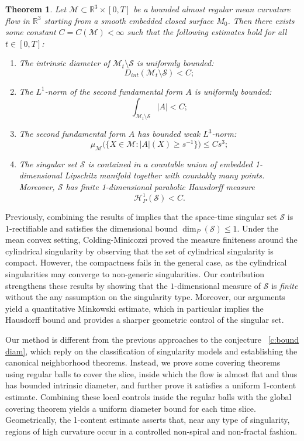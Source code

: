 \documentclass[11pt,reqno]{amsart}
\numberwithin{equation}{section}
\newcommand{\RR}{\mathds{R}}
\newcommand{\cH}{\mathcal{H}}
\newcommand{\cM}{\mathcal{M}}
\newcommand{\cS}{\mathcal{S}}
\newtheorem{theorem}[equation]{Theorem}
\theoremstyle{definition}
\theoremstyle{remark}
\theoremstyle{remark}
\theoremstyle{remark}
\theoremstyle{remark}\newtheorem{conjecture}[equation]{Conjecture}
\theoremstyle{remark}\newtheorem{question}[equation]{Question}
\begin{document}
\begin{theorem}\label{t:main almost regular}
    Let $\cM \subset \RR^3 \times [0,T]$ be a bounded almost regular mean curvature flow in $\RR^3$ starting from a smooth embedded closed surface $M_0$. Then there exists some constant $C=C(\cM)< \infty$ such that the following estimates hold for all $t\in [0,T]$:
    \begin{enumerate}
        \item The intrinsic diameter of $\cM_t \setminus\cS$ is uniformly bounded:  $$D_{int}(\cM_t\setminus\cS) < C;$$
        \item The $L^1$-norm of the second fundamental form $A$ is uniformly bounded: $$\int_{\cM_t\setminus \cS} |A| < C;$$
        \item The second fundamental form $A$ has bounded weak $L^3$-norm:
        $$\mu_{\cM}\big( \{ X \in \cM : |A|(X) \ge s^{-1} \} \big) \le C s^3;$$
        \item The singular set $\cS$ is contained in a countable union of embedded 1-dimensional Lipschitz manifold together with countably many points. Moreover, $\cS$ has finite 1-dimensional parabolic Hausdorff measure $$\cH_P^1(\cS) < C.$$
    \end{enumerate}
\end{theorem}



Previously, combining the results of \cite{CHN13,CM16,BK23} implies that the space-time singular set $\cS$ is 1-rectifiable and satisfies the dimensional bound $\dim_P(\cS) \le 1$. Under the mean convex setting, Colding-Minicozzi \cite{CM16} proved the measure finiteness around the cylindrical singularity by observing that the set of cylindrical singularity is compact. However, the compactness fails in the general case, as the cylindrical singularities may converge to non-generic singularities. Our contribution strengthens these results by showing that the $1$-dimensional measure of $\mathcal{S}$ is \emph{finite} without the any assumption on the singularity type. Moreover, our arguments yield a quantitative Minkowski estimate, which in particular implies the Hausdorff bound and provides a sharper geometric control of the singular set.



Our method is different from the previous approaches to the conjecture~ \ref{c:bound diam}, which reply on the classification of singularity models and establishing the canonical neighborhood theorems. Instead, we prove some covering theorems using regular balls to cover the slice, inside which the flow is almost flat and thus has bounded intrinsic diameter, and further prove it satisfies a uniform 1-content estimate. Combining these local controls inside the regular balls with the global covering theorem yields a uniform diameter bound for each time slice. Geometrically, the 1-content estimate asserts that, near any type of singularity, regions of high curvature occur in a controlled non-spiral and non-fractal fashion.
\end{document}
